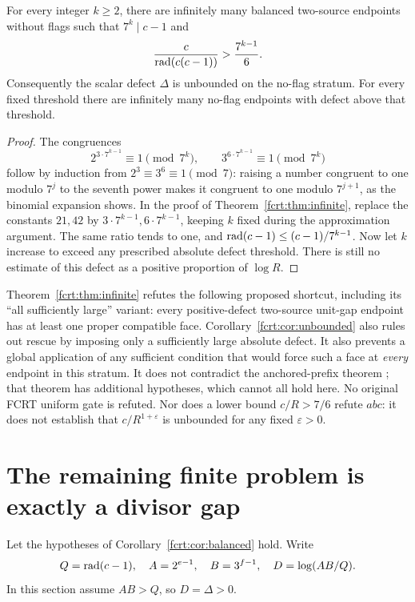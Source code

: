 \begin{corollary}\label{fcrt:cor:unbounded}
For every integer \(k\ge2\), there are infinitely many balanced two-source
endpoints without flags such that \(7^k\mid c-1\) and
\[
 \frac{c}{\operatorname{rad}(c(c-1))}>\frac{7^{k-1}}6.
\]
Consequently the scalar defect \(\Delta\) is unbounded on the no-flag
stratum. For every fixed threshold there are infinitely many no-flag
endpoints with defect above that threshold.
\end{corollary}
\begin{proof}
The congruences
\[
 2^{3\cdot7^{k-1}}\equiv1\pmod{7^k},\qquad
 3^{6\cdot7^{k-1}}\equiv1\pmod{7^k}
\]
follow by induction from \(2^3\equiv3^6\equiv1\pmod7\): raising a number
congruent to one modulo \(7^j\) to the seventh power makes it congruent to
one modulo \(7^{j+1}\), as the binomial expansion shows. In the proof of
Theorem~\ref{fcrt:thm:infinite}, replace the constants \(21,42\) by
\(3\cdot7^{k-1},6\cdot7^{k-1}\), keeping \(k\) fixed during the
approximation argument. The same ratio tends to one, and
\(\operatorname{rad}(c-1)\le(c-1)/7^{k-1}\). Now let \(k\) increase to exceed any
prescribed absolute defect threshold. There is still no estimate of this
defect as a positive proportion of \(\log R\).
\end{proof}

\begin{remark}
Theorem~\ref{fcrt:thm:infinite} refutes the following proposed shortcut, including
its ``all sufficiently large'' variant: every positive-defect two-source
unit-gap endpoint has at least one proper compatible face. Corollary~\ref{fcrt:cor:unbounded}
also rules out rescue by imposing only a sufficiently large absolute defect. It also prevents
a global application of any sufficient condition that would force such a
face at \emph{every} endpoint in this stratum. It does not contradict the
anchored-prefix theorem \cite{fcrt:repoanchor}; that theorem has additional
hypotheses, which cannot all hold here. No original FCRT uniform gate is
refuted. Nor does a lower bound \(c/R>7/6\) refute \(abc\): it does not
establish that \(c/R^{1+\varepsilon}\) is unbounded for any fixed
\(\varepsilon>0\).
\end{remark}

\section{The remaining finite problem is exactly a divisor gap}
Let the hypotheses of Corollary~\ref{fcrt:cor:balanced} hold. Write
\[
 Q=\operatorname{rad}(c-1),\quad A=2^{e-1},\quad B=3^{f-1},\quad D=\log(AB/Q).
\]
In this section assume \(AB>Q\), so \(D=\Delta>0\).

